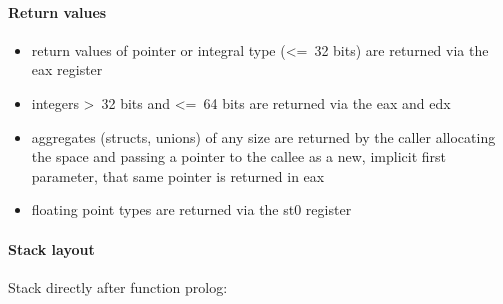 \paragraph{Return values}

\begin{itemize}
\item return values of pointer or integral type (\textless=\ 32 bits) are returned via the eax register
\item integers \textgreater\ 32 bits and \textless=\ 64 bits are returned via the eax and edx
\item aggregates (structs, unions) of any size are returned by the caller allocating the space and passing
a pointer to the callee as a new, implicit first parameter, that same pointer is returned in eax
\item floating point types are returned via the st0 register
\end{itemize}


\paragraph{Stack layout}

Stack directly after function prolog:\\

